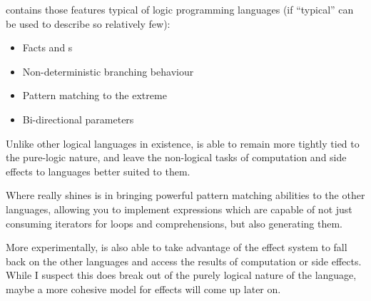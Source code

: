 \Law{} contains those features typical of logic programming languages
(if ``typical'' can be used to describe so relatively few):
\begin{itemize}
    \item Facts and s
    \item Non-deterministic branching behaviour
    \item Pattern matching to the extreme
    \item Bi-directional parameters
\end{itemize}

Unlike other logical languages in existence, \Law{} is able to remain more
tightly tied to the pure-logic nature, and leave the non-logical tasks of
computation and side effects to languages better suited to them.

Where \Law{} really shines is in bringing powerful pattern matching
abilities to the other languages, allowing you to implement expressions
which are capable of not just consuming iterators for loops and
comprehensions, but also generating them.

More experimentally, \Law{} is also able to take advantage of the
effect system to fall back on the other languages and access the
results of computation or side effects. While I suspect this does
break out of the purely logical nature of the language, maybe a
more cohesive model for effects will come up later on.
